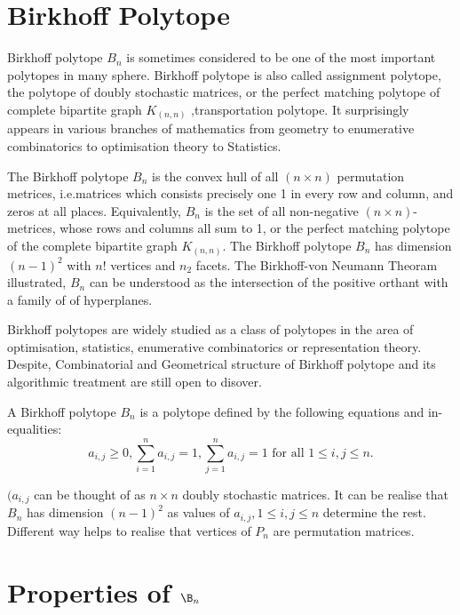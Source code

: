 \section{Birkhoff Polytope}

Birkhoff polytope $B_n$ is sometimes considered to be one of the most important polytopes in many sphere. Birkhoff polytope is also called assignment polytope, the polytope of doubly stochastic matrices, or the perfect matching polytope of complete bipartite graph $K_(n,n)$ ,transportation polytope. It surprisingly appears in various branches of mathematics from geometry to enumerative combinatorics to optimisation theory to Statistics.

The Birkhoff polytope $B_n$ is the convex hull of all $(n\times n)$ permutation metrices, i.e.matrices which consists precisely one 1 in every row and column, and zeros at all places. Equivalently, $B_n$ is the set of all non-negative $(n \times n)$-metrices, whose rows and columns all sum to 1, or the perfect matching polytope of the complete bipartite graph $K_(n,n)$. The Birkhoff polytope $B_n$ has dimension $(n-1)^2$ with $n!$ vertices and $n_2$ facets. The Birkhoff-von Neumann Theoram illustrated, $B_n$ can be understood as the intersection of the positive orthant with a family of of hyperplanes.

Birkhoff polytopes are widely studied as a class of polytopes in the area of optimisation, statistics, enumerative combinatorics or representation theory. Despite, Combinatorial and Geometrical structure of Birkhoff polytope and its algorithmic treatment are still open to disover.

A Birkhoff polytope $B_n$ is a polytope defined by the following equations and in-equalities:
\begin{equation}
a_{i,j} \geqslant 0, \sum_{i=1}^{n} a_{i,j} = 1, \sum_{j=1}^{n} a_{i,j}=1 \text{ for all } 1\leqslant i,j\leqslant n.
\label{eqn:Birkhoff_definition}
\end{equation}	

$(a_{i,j}$ can be thought of as  $n\times n$ doubly stochastic matrices. It can be realise that $B_n$ has dimension $(n-1)^2$ as values of $a_{i,j},1\leqslant i,j\leqslant n$ determine the rest. Different way helps to realise that vertices of $P_n$ are permutation matrices.

\section{Properties of $\B_n$}


